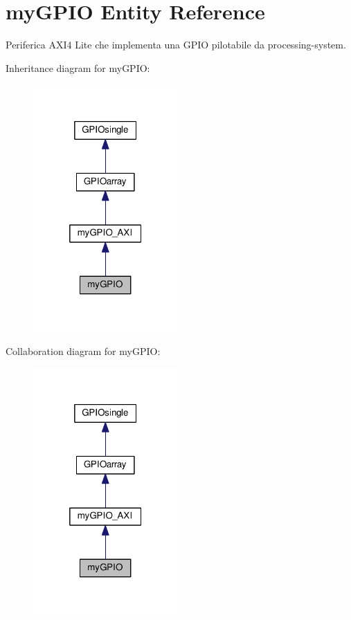 \hypertarget{classmy_g_p_i_o}{\section{my\+G\+P\+I\+O Entity Reference}
\label{classmy_g_p_i_o}
}


Periferica A\+X\+I4 Lite che implementa una G\+P\+I\+O pilotabile da processing-\/system.  




Inheritance diagram for my\+G\+P\+I\+O\+:
\nopagebreak
\begin{figure}[H]
\begin{center}
\leavevmode
\includegraphics[width=157pt]{classmy_g_p_i_o__inherit__graph}
\end{center}
\end{figure}


Collaboration diagram for my\+G\+P\+I\+O\+:
\nopagebreak
\begin{figure}[H]
\begin{center}
\leavevmode
\includegraphics[width=157pt]{classmy_g_p_i_o__coll__graph}
\end{center}
\end{figure}
